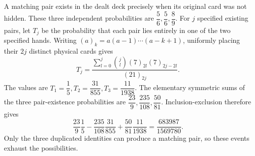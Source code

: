 A matching pair exists in the dealt deck precisely when its original card was not hidden. These three independent probabilities are $\dfrac{5}{6},\dfrac{5}{6},\dfrac{8}{9}$. For $ j $ specified existing pairs, let $ T_j $ be the probability that each pair lies entirely in one of the two specified hands. Writing $(a)_k=a(a-1)\cdots(a-k+1)$, uniformly placing their $ 2j $ distinct physical cards gives \[T_j=\dfrac{\sum_{l=0}^j\binom jl(7)_{2l}(7)_{2j-2l}}{(21)_{2j}}.\]The values are $ T_1=\dfrac{1}{5},T_2=\dfrac{31}{855},T_3=\dfrac{11}{1938}$. The elementary symmetric sums of the three pair-existence probabilities are $\dfrac{23}{9},\dfrac{235}{108},\dfrac{50}{81}$. Inclusion-exclusion therefore gives \[\dfrac{23}{9}\dfrac{1}{5}-\dfrac{235}{108}\dfrac{31}{855}+\dfrac{50}{81}\dfrac{11}{1938}=\boxed{\dfrac{683987}{1569780}}.\]Only the three duplicated identities can produce a matching pair, so these events exhaust the possibilities.

